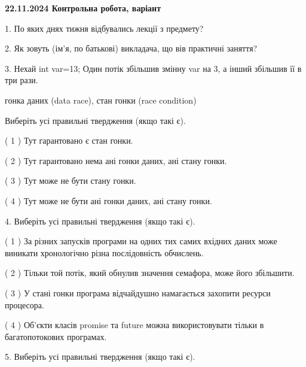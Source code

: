 \documentclass[12pt, ukrainian]{article}
\begin{document}
\vspace{4mm}
\newpage
\begin {large}

\textbf{22.11.2024 Контрольна робота, варіант  }\par


{
1. По яких днях тижня відбувались лекції з предмету?



\vspace{5mm}
2. Як зовуть (ім'я, по батькові) викладача, що вів практичні заняття?



\vspace{5mm}
3. Нехай int var=13; Один потік збільшив змінну var на 3, а інший збільшив її в три рази.

гонка даних (data race), стан гонки (race condition)

Виберіть усі правильні твердження (якщо такі є).\par
\vspace{2mm}
( 1 ) Тут гарантовано є стан гонки.%

( 2 ) Тут гарантовано нема ані гонки даних, ані стану гонки.%

( 3 ) Тут може не бути стану гонки.%

( 4 ) Тут може не бути ані гонки даних, ані стану гонки.%


\vspace{5mm}
4. Виберіть усі правильні твердження (якщо такі є).\par
\vspace{2mm}

( 1 ) За різних запусків програми на одних тих самих вхідних даних може виникати хронологічно різна послідовність обчислень.%

( 2 ) Тільки той потік, який обнулив значення семафора, може його збільшити.%

( 3 ) У стані гонки програма відчайдушно намагається захопити ресурси процесора.%

( 4 ) Об’єкти класів promise та future можна використовувати тільки в багатопотокових програмах.%


\vspace{5mm}
5. Виберіть усі правильні твердження (якщо такі є).\par
\vspace{2mm}

}
\end{large}
\end{document}
